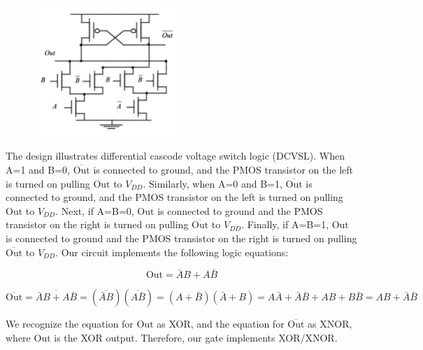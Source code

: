 \documentclass[fleqn]{article}
\begin{document}
\begin{enumerate}
\begin{enumerate}
			\begin{figure}[H]
				\centerline{\includegraphics[width=0.5\textwidth]{circuit4b.png}}
				\label{fig::circuit4b}
			\end{figure}
			
			The design illustrates differential cascode voltage switch logic (DCVSL). When A=1 and B=0, $\overline{\text{Out}}$ is connected to ground, and the PMOS transistor on the left is turned on pulling $\text{Out}$ to $V_{DD}$. Similarly, when A=0 and B=1, $\overline{\text{Out}}$ is connected to ground, and the PMOS transistor on the left is turned on pulling $\text{Out}$ to $V_{DD}$. Next, if A=B=0, $\text{Out}$ is connected to ground and the PMOS transistor on the right is turned on pulling $\overline{\text{Out}}$ to $V_{DD}$. Finally, if A=B=1, $\text{Out}$ is connected to ground and the PMOS transistor on the right is turned on pulling $\overline{\text{Out}}$ to $V_{DD}$. Our circuit implements the following logic equations:
			
			\begin{equation*}
				\text{Out} = \bar{A}B + A\bar{B}
			\end{equation*}
			
			\begin{equation*}
				\overline{\text{Out}} = \overline{\bar{A}B + A\bar{B}} = (\overline{\bar{A}B})(\overline{A\bar{B}}) = (A + \bar{B})(\bar{A} + B) = A\bar{A} + \bar{A}\bar{B} + AB + B\bar{B} = AB + \bar{A}\bar{B}
			\end{equation*}
			
			We recognize the equation for $\text{Out}$ as XOR, and the equation for $\overline{\text{Out}}$ as XNOR, where $\text{Out}$ is the XOR output. Therefore, our gate implements XOR/XNOR.
			
			\end{enumerate}			 
	\end{enumerate}
\end{document}
